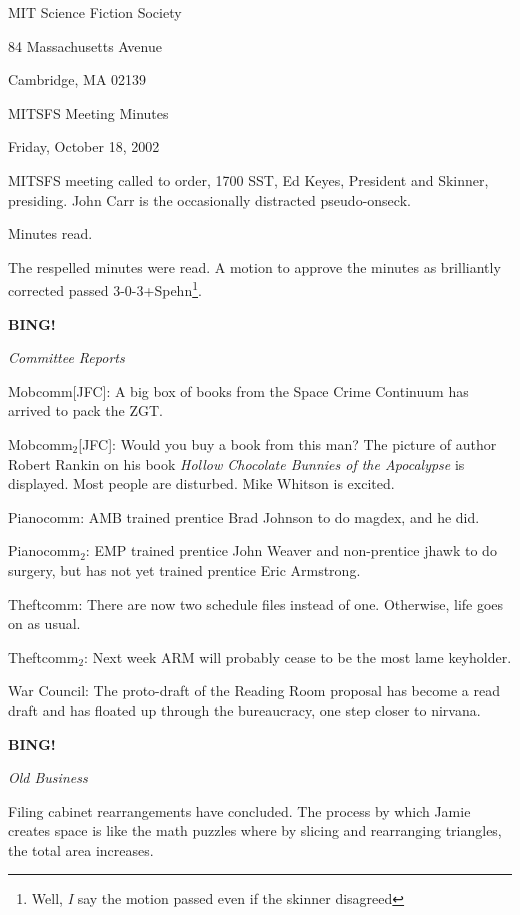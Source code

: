 \documentclass[12pt]{article}
\newcommand{\bing}{{\bf BING!} }
\newcommand{\goto}[1]{\bing \vskip 12pt \centerline{{\em{#1}}}}
\begin{document}
\begin{center}

MIT Science Fiction Society 

84 Massachusetts Avenue

Cambridge, MA 02139

\vspace{12pt}

MITSFS Meeting Minutes 

Friday, October 18, 2002

\end{center}
 
\vspace{18pt}

\setlength{\parskip}{6pt}

\noindent
MITSFS meeting called to order, 1700 SST,
Ed Keyes, President and Skinner, presiding.
John Carr is the occasionally distracted pseudo-onseck.

Minutes read.

The respelled minutes were read.  A motion to approve the minutes as
brilliantly corrected passed \hbox{3-0-3+Spehn}\footnote{Well, {\em I}
say the motion passed even if the skinner disagreed}.

\goto{Committee Reports}

Mobcomm[JFC]: A big box of books from the Space Crime Continuum has
arrived to pack the ZGT.

Mobcomm$_2$[JFC]: Would you buy a book from this man?  The picture
of author Robert Rankin on his book {\em Hollow Chocolate Bunnies
of the Apocalypse} is displayed.  Most people are disturbed.  Mike
Whitson is excited.

Pianocomm: AMB trained prentice Brad Johnson to do magdex, and
he did.

Pianocomm$_2$: EMP trained prentice John Weaver and non-prentice
jhawk to do surgery, but has not yet trained prentice Eric Armstrong.

Theftcomm: There are now two schedule files instead of one.
Otherwise, life goes on as usual.

Theftcomm$_2$: Next week ARM will probably cease to be the most
lame keyholder.

War Council: The proto-draft of the Reading Room proposal has become a
read draft and has floated up through the bureaucracy, one step closer
to nirvana.

\goto{Old Business}

Filing cabinet rearrangements have concluded.  The process by which
Jamie creates space is like the math puzzles where by slicing and
rearranging triangles, the total area increases.
\end{document}
